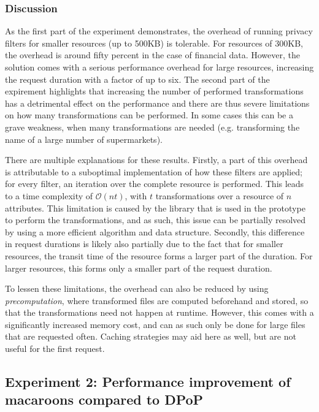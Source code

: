 \newpage





\subsubsection{Discussion}
As the first part of the experiment demonstrates, the overhead of running privacy filters for smaller resources (up to 500KB) is tolerable. For resources of 300KB, the overhead is around fifty percent in the case of financial data. However, the solution comes with a serious performance overhead for large resources, increasing the request duration with a factor of up to six. The second part of the expirement highlights that increasing the number of performed transformations has a detrimental effect on the performance and there are thus severe limitations on how many transformations can be performed. In some cases this can be a grave weakness, when many transformations are needed (e.g. transforming the name of a large number of supermarkets).

There are multiple explanations for these results. Firstly, a part of this overhead is attributable to a suboptimal implementation of how these filters are applied; for every filter, an iteration over the complete resource is performed. This leads to a time complexity of $\mathcal{O}(nt)$, with $t$ transformations over a resource of $n$ attributes. This limitation is caused by the library that is used in the prototype to perform the transformations, and as such, this issue can be partially resolved by using a more efficient algorithm and data structure. Secondly, this difference in request durations is likely also partially due to the fact that for smaller resources, the transit time of the resource forms a larger part of the duration. For larger resources, this forms only a smaller part of the request duration.

To lessen these limitations, the overhead can also be reduced by using \textit{precomputation}, where transformed files are computed beforehand and stored, so that the transformations need not happen at runtime. However, this comes with a significantly increased memory cost, and can as such only be done for large files that are requested often. Caching strategies may aid here as well, but are not useful for the first request. 


\newpage
\subsection{Experiment 2: Performance improvement of macaroons compared to DPoP}
\label{sec:macaroons-performance}
